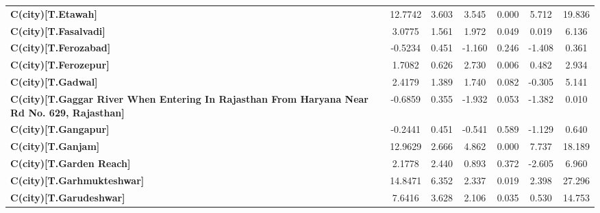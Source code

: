 \begin{center}
\begin{tabular}{lcccccc}
\textbf{C(city)[T.Etawah]}                                                                          &      12.7742  &        3.603     &     3.545  &         0.000        &        5.712    &       19.836     \\
\textbf{C(city)[T.Fasalvadi]}                                                                       &       3.0775  &        1.561     &     1.972  &         0.049        &        0.019    &        6.136     \\
\textbf{C(city)[T.Ferozabad]}                                                                       &      -0.5234  &        0.451     &    -1.160  &         0.246        &       -1.408    &        0.361     \\
\textbf{C(city)[T.Ferozepur]}                                                                       &       1.7082  &        0.626     &     2.730  &         0.006        &        0.482    &        2.934     \\
\textbf{C(city)[T.Gadwal]}                                                                          &       2.4179  &        1.389     &     1.740  &         0.082        &       -0.305    &        5.141     \\
\textbf{C(city)[T.Gaggar River When Entering In Rajasthan From Haryana Near Rd No. 629, Rajasthan]} &      -0.6859  &        0.355     &    -1.932  &         0.053        &       -1.382    &        0.010     \\
\textbf{C(city)[T.Gangapur]}                                                                        &      -0.2441  &        0.451     &    -0.541  &         0.589        &       -1.129    &        0.640     \\
\textbf{C(city)[T.Ganjam]}                                                                          &      12.9629  &        2.666     &     4.862  &         0.000        &        7.737    &       18.189     \\
\textbf{C(city)[T.Garden Reach]}                                                                    &       2.1778  &        2.440     &     0.893  &         0.372        &       -2.605    &        6.960     \\
\textbf{C(city)[T.Garhmukteshwar]}                                                                  &      14.8471  &        6.352     &     2.337  &         0.019        &        2.398    &       27.296     \\
\textbf{C(city)[T.Garudeshwar]}                                                                     &       7.6416  &        3.628     &     2.106  &         0.035        &        0.530    &       14.753     \\

\end{tabular}
\end{center}
